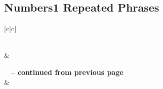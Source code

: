 \subsection{Numbers1 Repeated Phrases}


\normalsize
 
\begin{center}
\begin{longtable}{|c|c|}
\caption[Numbers1 Repeated Phrases]{Numbers1 Repeated Phrases}\label{table:Repeated Phrases Numbers1} \\
\hline {} &  \\ \hline 
\endfirsthead
 
{{\bfseries \tablename\ \thetable{} -- continued from previous page}} \\  
\hline {} &  \\ \hline 
\endhead
 

\end{longtable}
\end{center}
